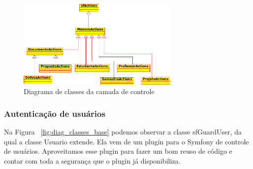 \begin{figure}[htbp]
\centering
\includegraphics[width=0.7\textwidth]{fig/uml_controllers.png}
\caption{Diagrama de classes da camada de controle}
\label{fig:diag_controllers}
\end{figure}

\subsubsection{Autenticação de usuários}
Na Figura ~\ref{fig:diag_classes_base} podemos observar a classe sfGuardUser, da qual a classe Usuario extende.
Ela vem de um plugin para o Symfony de controle de usuários. Aproveitamos esse plugin
para fazer um bom reuso de código e contar com toda a segurança que o plugin já disponibiliza.

